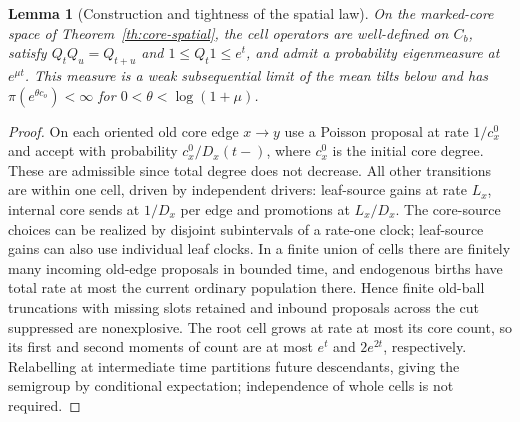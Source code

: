 \documentclass[11pt]{article}
\newtheorem{lemma}{Lemma}[section]
\theoremstyle{remark}
\numberwithin{equation}{section}
\begin{document}
\begin{lemma}[Construction and tightness of the spatial law]\label{lem:core-spatial}
On the marked-core space of Theorem~\ref{th:core-spatial}, the cell operators are well-defined on $C_b$, satisfy $Q_tQ_u=Q_{t+u}$ and $1\le Q_t1\le e^t$, and admit a probability eigenmeasure at $e^{\mu t}$. This measure is a weak subsequential limit of the mean tilts below and has $\pi(e^{\theta c_o})<\infty$ for $0<\theta<\log(1+\mu)$.
\end{lemma}
\begin{proof}
On each oriented old core edge $x\to y$ use a Poisson proposal at rate $1/c_x^0$ and accept with probability $c_x^0/D_x(t-)$, where $c_x^0$ is the initial core degree. These are admissible since total degree does not decrease. All other transitions are within one cell, driven by independent drivers: leaf-source gains at rate $L_x$, internal core sends at $1/D_x$ per edge and promotions at $L_x/D_x$. The core-source choices can be realized by disjoint subintervals of a rate-one clock; leaf-source gains can also use individual leaf clocks. In a finite union of cells there are finitely many incoming old-edge proposals in bounded time, and endogenous births have total rate at most the current ordinary population there. Hence finite old-ball truncations with missing slots retained and inbound proposals across the cut suppressed are nonexplosive. The root cell grows at rate at most its core count, so its first and second moments of count are at most $e^t$ and $2e^{2t}$, respectively. Relabelling at intermediate time partitions future descendants, giving the semigroup by conditional expectation; independence of whole cells is not required.


\end{proof}
\end{document}

